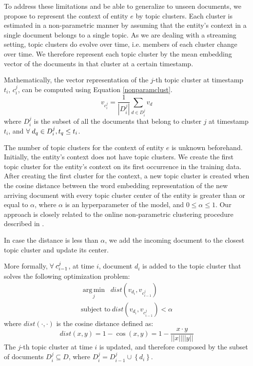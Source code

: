 \documentclass{article}
\DeclareMathOperator*{\argmin}{arg\,min}
\begin{document}
To address these limitations and be able to generalize to unseen documents, we propose to represent the context of entity $e$ by topic clusters. Each cluster is estimated in a non-parametric manner by assuming that the entity's context in a single document belongs to a single topic. As we are dealing with a streaming setting, topic clusters do evolve over time, i.e. members of each cluster change over time. We therefore represent each topic cluster by the mean embedding vector of the documents in that cluster at a certain timestamp.

Mathematically, the vector representation of the $j$-th topic cluster at timestamp $t_i$, $c^j_i$, can be computed using Equation \ref{nonparamclust}.
\begin{equation}
\label{nonparamclust}
v_{c^j_i} = \frac{1}{|D^j_i|} \sum_{d \in D^j_i}{v_d}
\end{equation}
where $D^j_i$ is the subset of all the documents that belong to cluster $j$ at timestamp $t_i$, and $\forall\hspace{1mm}d_q \in D^j_i, t_q \leq t_i$.

The number of topic clusters for the context of entity $e$ is unknown beforehand. Initially, the entity's context does not have topic clusters. We create the first topic cluster for the entity's context on its first occurrence in the training data. After creating the first cluster for the context, a new topic cluster is created when the cosine distance between the word embedding representation of the new arriving document with every topic cluster center of the entity is greater than or equal to $\alpha$, where $\alpha$ is an hyperparameter of the model, and $0 \leq \alpha \leq 1$. Our approach is closely related to the online non-parametric clustering procedure described in \citet{Arvind14}.

In case the distance is less than $\alpha$, we add the incoming document to the closest topic cluster and update its center. 

More formally, $\forall\hspace{1mm}c^j_{i-1}$, at time $i$, document $d_i$ is added to the topic cluster that solves the following optimization problem:
\begin{eqnarray}
\underset{j}{\argmin}\;\; dist(v_{d_i}, v_{c^j_{i-1}}) \nonumber\\
\text{subject to}~dist(v_{d_i}, v_{c^j_{i-1}}) < \alpha 
\end{eqnarray}
where $dist(\cdot,\cdot)$ is the cosine distance defined as: %
\begin{equation}
\label{cosine}
dist(x,y) = 1 - \cos(x,y) = 1 - \frac{x \cdot y}{||x||||y||}
\end{equation}
The $j$-th topic cluster at time $i$ is updated, and therefore composed by the subset of documents $D^j_i \subseteq D$, where $D^j_i = D^j_{i-1} \cup \left\{ {d_i}\right\}$.
\end{document}
